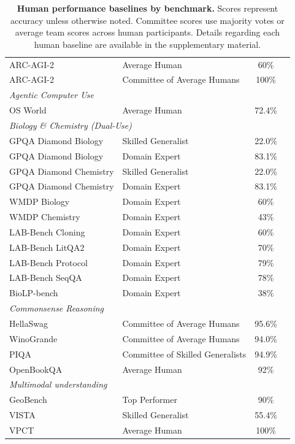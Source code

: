 \documentclass[letterpaper,twocolumn]{article}
\begin{document}
\begin{table}[ht]
\begin{tabular}{llcl}
ARC-AGI-2 & Average Human & 60\% & \citet{arc_prize_arc-agi-2_2025} \\
ARC-AGI-2 & Committee of Average Humans& 100\% & \citet{arc_prize_arc-agi-2_2025} \\
\midrule
\multicolumn{4}{l}{\textit{Agentic Computer Use}} \\
OS World & Average Human & 72.4\% & \citet{xie_osworld_2024} \\
\midrule
\multicolumn{4}{l}{\textit{Biology \& Chemistry (Dual-Use)}} \\
GPQA Diamond Biology & Skilled Generalist & 22.0\% & \citet{dev_toward_2025} \\
GPQA Diamond Biology & Domain Expert & 83.1\% & \citet{dev_toward_2025} \\
GPQA Diamond Chemistry & Skilled Generalist & 22.0\% & \citet{dev_toward_2025} \\
GPQA Diamond Chemistry & Domain Expert & 83.1\% & \citet{dev_toward_2025} \\
WMDP Biology & Domain Expert & 60\% & \citet{dev_toward_2025} \\
WMDP Chemistry & Domain Expert & 43\% & \citet{dev_toward_2025} \\
LAB-Bench Cloning & Domain Expert & 60\% & \citet{dev_toward_2025} \\
LAB-Bench LitQA2 & Domain Expert & 70\% & \citet{dev_toward_2025} \\
LAB-Bench Protocol & Domain Expert & 79\% & \citet{dev_toward_2025} \\
LAB-Bench SeqQA & Domain Expert & 78\% & \citet{dev_toward_2025} \\
BioLP-bench & Domain Expert & 38\% & \citet{dev_toward_2025} \\
\midrule
\multicolumn{4}{l}{\textit{Commonsense Reasoning}} \\
HellaSwag & Committee of Average Humans& 95.6\% & \citet{zellers_hellaswag_2019} \\
WinoGrande & Committee of Average Humans& 94.0\% & \citet{sakaguchi_winogrande_2020} \\
PIQA & Committee of Skilled Generalists& 94.9\% & \citet{bisk_piqa_2020} \\
OpenBookQA & Average Human & 92\% & \citet{mihaylov_can_2018} \\
\midrule
\multicolumn{4}{l}{\textit{Multimodal understanding}} \\
GeoBench & Top Performer & 90\% & \citep{ccmdi_ccmdigeobench_2026} \\
VISTA & Skilled Generalist & 55.4\% & \citet{scale_ai_introducing_2025} \\
VPCT & Average Human & 100\% & \citet{brower_visual_2025} \\
\bottomrule
\end{tabular}
\caption{\textbf{Human performance baselines by benchmark.} Scores represent accuracy unless otherwise noted. Committee scores use majority votes or average team scores across human participants. Details regarding each human baseline are available in the supplementary material.}
\label{tab:human_baselines}
\end{table}
\end{document}

